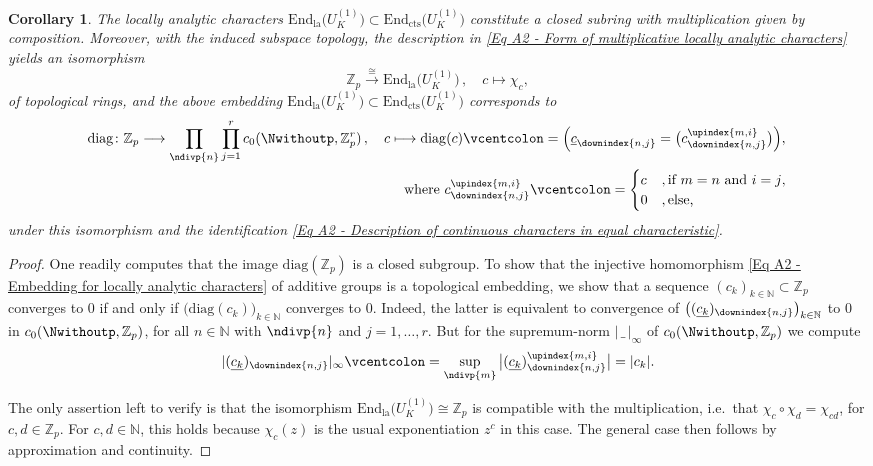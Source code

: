 \documentclass[a4paper, reqno, 10pt]{amsart}
\newtheorem{corollary}[theorem]{Corollary}
\theoremstyle{definition}
\numberwithin{equation}{section}
\newcommand{\abs}[1]{{\lvert{#1}\rvert}}
\newcommand{\blank}{{\,\_\,}}
\newcommand{\cont}{{\mathrm{cts}}}
\newcommand{\defeq}{\vcentcolon=}
\newcommand{\End}{{\mathrm{End}}}
\newcommand{\lra}{\longrightarrow}
\newcommand{\lto}{\longmapsto}
\newcommand{\ul}[1]{{\underline{#1}}}
\newcommand{\BN}{{\mathbb {N}}}
\newcommand{\BZ}{{\mathbb {Z}}}
\begin{document}
\begin{corollary}\label{Cor A2 - Ring of locally analytic characters in equal characteristic}
	The locally analytic characters $\End_\mathrm{la} \big(U_K^{(1)} \big) \subset \End_\cont \big(U_K^{(1)} \big)$ constitute a closed subring with multiplication given by composition. 
	Moreover, with the induced subspace topology, the description in \eqref{Eq A2 - Form of multiplicative locally analytic characters} yields an isomorphism
	\begin{equation*}
		\BZ_p \overset{\cong}{\lra} \End_\mathrm{la}\big(U_K^{(1)} \big) \,,\quad c \lto \chi_c ,
	\end{equation*}
	of topological rings, and the above embedding $\End_\mathrm{la} \big(U_K^{(1)} \big) \subset \End_\cont \big(U_K^{(1)} \big)$ corresponds to 
	\begin{align}\label{Eq A2 - Embedding for locally analytic characters}
		\mathrm{diag}\colon \BZ_p \lra \prod_\ndivp{n} \prod_{j=1}^{r}  c_0(\Nwithoutp,\BZ_p^r) \,,\quad c &\lto \mathrm{diag}(c) \defeq \Big(\ul{c}_\downindex{{n,j}}= \big(c_\downindex{{n,j}}^\upindex{{m,i}} \big) \Big) , \\ 
		&\quad\text{where $c_\downindex{{n,j}}^\upindex{{m,i}} \defeq \begin{cases}	c&, \text{if $m=n$ and $i=j$,} \\
				0	&, \text{else,}					\end{cases}$} \nonumber
	\end{align}
	under this isomorphism and the identification \eqref{Eq A2 - Description of continuous characters in equal characteristic}.
\end{corollary}
\begin{proof}
	One readily computes that the image $\mathrm{diag}(\BZ_p)$ is a closed subgroup.
	To show that the injective homomorphism \eqref{Eq A2 - Embedding for locally analytic characters} of additive groups is a topological embedding, we show that a sequence $(c_k)_{k\in \BN} \subset \BZ_p$ converges to $0$ if and only if $\big( \mathrm{diag}(c_k) \big)_{k\in \BN}$ converges to $0$.
	Indeed, the latter is equivalent to convergence of $\big( (\ul{c_k})_\downindex{n,j} \big)_{k\in \BN}$ to $0$ in $c_0 (\Nwithoutp, \BZ_p)$, for all $n \in \BN$ with $\ndivp{n}$ and $j=1,\ldots,r$.
	But for the supremum-norm $\abs{\blank}_\infty$ of $c_0 (\Nwithoutp, \BZ_p)$ we compute
	\[ \lvert (\ul{c_k})_\downindex{n,j} \rvert_\infty \defeq \sup_{\ndivp{m}} \big\lvert (\ul{c_k})_\downindex{n,j}^\upindex{m,i} \big\rvert = \abs{c_k} . \]
	
	The only assertion left to verify is that the isomorphism $\End_\mathrm{la} \big(U_K^{(1)} \big) \cong \BZ_p$ is compatible with the multiplication, i.e.\ that $\chi_c \circ \chi_d = \chi_{cd}$, for $c,d \in \BZ_p$.
	For $c,d \in \BN$, this holds because $\chi_c(z)$ is the usual exponentiation $z^c$ in this case.
	The general case then follows by approximation and continuity.	
\end{proof}











\sloppy
\AtNextBibliography{\small}
\printbibliography
\end{document}
